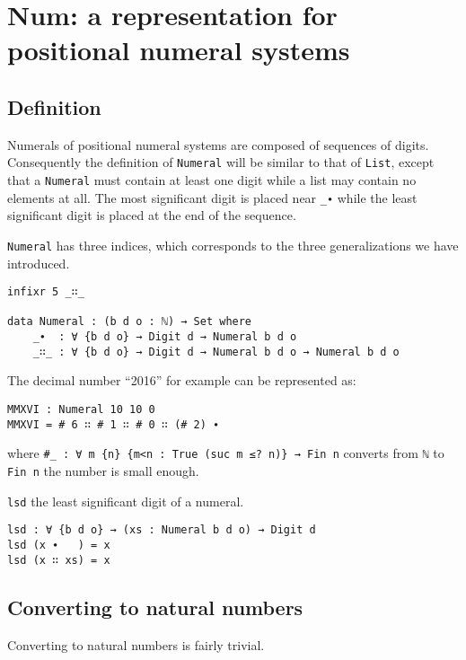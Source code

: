\documentclass[\main/thesis.tex]{subfiles}
\begin{document}
\section{Num: a representation for positional numeral systems}\label{num}

\subsection{Definition}

Numerals of positional numeral systems are composed of sequences of digits.
Consequently the definition of {\lstinline|Numeral|} will be similar to that of
{\lstinline|List|},
except that a {\lstinline|Numeral|} must contain at least one digit while a list
may contain no elements at all.
The most significant digit is placed near {\lstinline|_∙|} while the least
significant digit is placed at the end of the sequence.

{\lstinline|Numeral|} has three indices, which corresponds to the three
generalizations we have introduced.

\begin{lstlisting}
infixr 5 _∷_

data Numeral : (b d o : ℕ) → Set where
    _∙  : ∀ {b d o} → Digit d → Numeral b d o
    _∷_ : ∀ {b d o} → Digit d → Numeral b d o → Numeral b d o
\end{lstlisting}

The decimal number ``2016'' for example can be represented as:

\begin{lstlisting}
MMXVI : Numeral 10 10 0
MMXVI = # 6 ∷ # 1 ∷ # 0 ∷ (# 2) ∙
\end{lstlisting}
%
where {\lstinline|#_ : ∀ m {n} {m<n : True (suc m ≤? n)} → Fin n|} converts from
{\lstinline|ℕ|} to {\lstinline|Fin n|}  the number is small enough.

\lstinline|lsd|  the least significant digit of a numeral.

\begin{lstlisting}
lsd : ∀ {b d o} → (xs : Numeral b d o) → Digit d
lsd (x ∙   ) = x
lsd (x ∷ xs) = x
\end{lstlisting}

\subsection{Converting to natural numbers}

Converting to natural numbers is fairly trivial.
\end{document}
